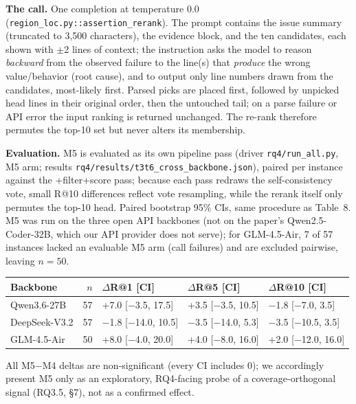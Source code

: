 \documentclass[11pt]{article}
\newcommand{\code}[1]{\texttt{#1}}
\begin{document}
\smallskip\noindent\textbf{The call.} One completion at temperature $0.0$ (\code{region\_loc.py::assertion\_rerank}). The prompt contains the issue summary (truncated to 3{,}500 characters), the evidence block, and the ten candidates, each shown with $\pm$2 lines of context; the instruction asks the model to reason \emph{backward} from the observed failure to the line(s) that \emph{produce} the wrong value/behavior (root cause), and to output only line numbers drawn from the candidates, most-likely first. Parsed picks are placed first, followed by unpicked head lines in their original order, then the untouched tail; on a parse failure or API error the input ranking is returned unchanged. The re-rank therefore permutes the top-10 set but never alters its membership.

\smallskip\noindent\textbf{Evaluation.} M5 is evaluated as its own pipeline pass (driver \code{rq4/run\_all.py}, M5 arm; results \code{rq4/results/t3t6\_cross\_backbone.json}), paired per instance against the +filter+score pass; because each pass redraws the self-consistency vote, small R@10 differences reflect vote resampling, while the rerank itself only permutes the top-10 head. Paired bootstrap 95\% CIs, same procedure as Table~8. M5 was run on the three open API backbones (not on the paper's Qwen2.5-Coder-32B, which our API provider does not serve); for GLM-4.5-Air, 7 of 57 instances lacked an evaluable M5 arm (call failures) and are excluded pairwise, leaving $n{=}50$.

\begin{center}\small
\begin{tabular}{lrlll}
\toprule
Backbone & $n$ & $\Delta$R@1 [CI] & $\Delta$R@5 [CI] & $\Delta$R@10 [CI] \\
\midrule
Qwen3.6-27B & 57 & +7.0 [$-$3.5, 17.5] & +3.5 [$-$3.5, 10.5] & $-$1.8 [$-$7.0, 3.5] \\
DeepSeek-V3.2 & 57 & $-$1.8 [$-$14.0, 10.5] & $-$3.5 [$-$14.0, 5.3] & $-$3.5 [$-$10.5, 3.5] \\
GLM-4.5-Air & 50 & +8.0 [$-$4.0, 20.0] & +4.0 [$-$8.0, 16.0] & +2.0 [$-$12.0, 16.0] \\
\bottomrule
\end{tabular}
\end{center}

\noindent All M5$-$M4 deltas are non-significant (every CI includes 0); we accordingly present M5 only as an exploratory, RQ4-facing probe of a coverage-orthogonal signal (RQ3.5, \S7), not as a confirmed effect.
\end{document}
